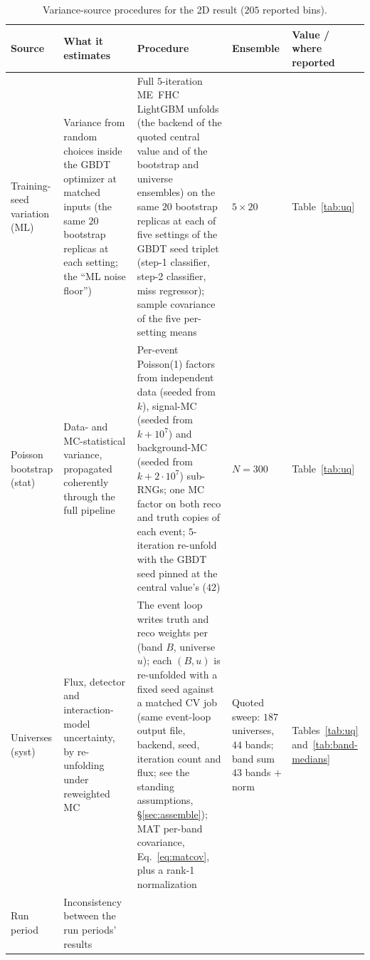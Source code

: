 \begin{table}[!htbp]
\centering\footnotesize
\setlength{\tabcolsep}{3pt}
\caption{Variance-source procedures for the 2D result ($205$ reported bins).}
\label{tab:variance-sources}
\begin{tabular}{@{}>{\raggedright\arraybackslash}p{}
                >{\raggedright\arraybackslash}p{}
                >{\raggedright\arraybackslash}p{}
                >{\raggedright\arraybackslash}p{}
                >{\raggedright\arraybackslash}p{}@{}}
\toprule
Source & What it estimates & Procedure & Ensemble & Value / where reported \\
\midrule
Training-seed variation (ML) & Variance from random choices inside the GBDT optimizer at matched inputs (the same $20$ bootstrap replicas at each setting; the ``ML noise floor'') &
  Full $5$-iteration ME~FHC LightGBM unfolds (the backend of the quoted central value and of the bootstrap and universe ensembles) on the same $20$ bootstrap replicas at each of five settings of the GBDT seed triplet (step-1 classifier, step-2 classifier, miss regressor); sample covariance of the five per-setting means &
  $5\times20$ &
  Table~\ref{tab:uq} \\
Poisson bootstrap (stat) & Data- and MC-statistical variance, propagated coherently through the full pipeline &
  Per-event Poisson(1) factors from independent data (seeded from $k$), signal-MC (seeded from $k + 10^{7}$) and background-MC (seeded from $k + 2\cdot10^{7}$) sub-RNGs; one MC factor on both reco and truth copies of each event; $5$-iteration re-unfold with the GBDT seed pinned at the central value's ($42$) &
  $N=300$ &
  Table~\ref{tab:uq} \\
Universes (syst) & Flux, detector and interaction-model uncertainty, by re-unfolding under reweighted MC &
  The event loop writes truth and reco weights per (band $B$, universe $u$); each $(B,u)$ is re-unfolded with a fixed seed against a matched CV job (same event-loop output file, backend, seed, iteration count and flux; see the standing assumptions, \S\ref{sec:assemble}); MAT per-band covariance, Eq.~\eqref{eq:matcov}, plus a rank-1 normalization &
  Quoted sweep: $187$ universes, $44$ bands; band sum $43$ bands $+$ norm &
  Tables~\ref{tab:uq} and~\ref{tab:band-medians} \\ %
Run period & Inconsistency between the run periods' results &

\end{tabular}
\end{table}
